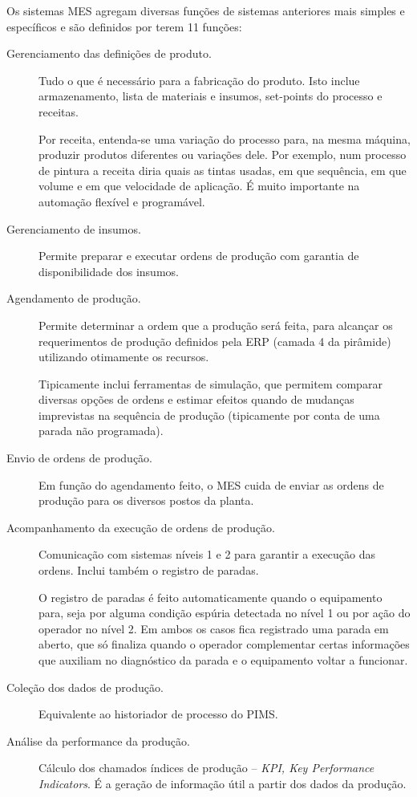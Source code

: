 Os sistemas MES agregam diversas funções de sistemas anteriores mais simples e específicos e são definidos por terem 11 funções:
\begin{description}
	\item[Gerenciamento das definições de produto.] Tudo o que é necessário para a fabricação do produto. Isto inclue armazenamento, lista de materiais e insumos, set-points do processo e receitas.

	Por receita, entenda-se uma variação do processo para, na mesma máquina, produzir produtos diferentes ou variações dele. Por exemplo, num processo de pintura a receita diria quais as tintas usadas, em que sequência, em que volume e em que velocidade de aplicação. É muito importante na automação flexível e programável.

	\item[Gerenciamento de insumos.] Permite preparar e executar ordens de produção com garantia de disponibilidade dos insumos.
	\item[Agendamento de produção.] Permite determinar a ordem que a produção será feita, para alcançar os requerimentos de produção definidos pela ERP (camada 4 da pirâmide) utilizando otimamente os recursos.

	Tipicamente inclui ferramentas de simulação, que permitem comparar diversas opções de ordens e estimar efeitos quando de mudanças imprevistas na sequência de produção (tipicamente por conta de uma parada não programada).

	\item[Envio de ordens de produção.] Em função do agendamento feito, o MES cuida de enviar as ordens de produção para os diversos postos da planta.
	\item[Acompanhamento da execução de ordens de produção.] Comunicação com sistemas níveis 1 e 2 para garantir a execução das ordens. Inclui também o registro de paradas.

	O registro de paradas é feito automaticamente quando o equipamento para, seja por alguma condição espúria detectada no nível 1 ou por ação do operador no nível 2. Em ambos os casos fica registrado uma parada em aberto, que só finaliza quando o operador complementar certas informações que auxiliam no diagnóstico da parada e o equipamento voltar a funcionar.

	\item[Coleção dos dados de produção.] Equivalente ao historiador de processo do PIMS.
	\item[Análise da performance da produção.] Cálculo dos chamados índices de produção -- \emph{KPI, Key Performance Indicators}. É a geração de informação útil a partir dos dados da produção.


\end{description}
